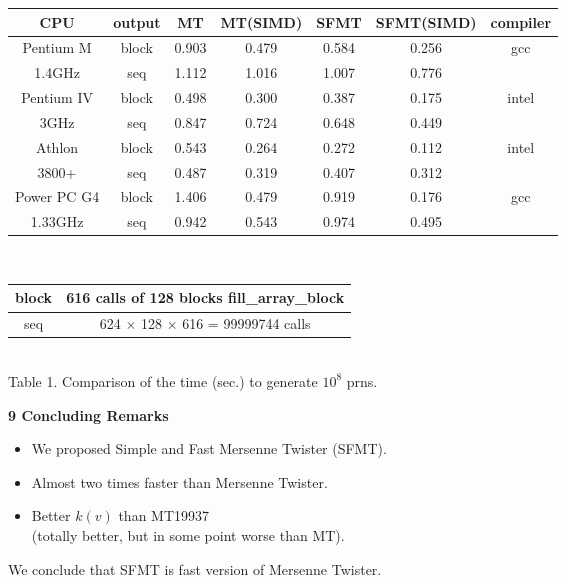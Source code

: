 \documentclass[a4j,12pt,landscape]{jarticle}
\begin{document}
\newpage
\begin{center}
\begin{tabular}{|c|c||c|c|c|c|c|}
\hline
CPU & output & MT & MT{\Large(SIMD)} & SFMT & SFMT{\Large (SIMD)} & {\Large compiler} \\
\hline \hline
{\Large Pentium M}  & block & 0.903 & 0.479 & 0.584 & 0.256 & gcc\\ \cline{2-6}
{\Large 1.4GHz} & seq & 1.112 & 1.016 & 1.007 & 0.776 & \\ \hline
{\Large Pentium IV} & block & 0.498 & 0.300 & 0.387 & 0.175 & intel\\ \cline{2-6}
{\Large 3GHz} & seq & 0.847 & 0.724 & 0.648 & 0.449 & \\ \hline
{\Large Athlon} & block & 0.543 & 0.264 & 0.272 & 0.112 & intel \\ \cline{2-6}
{\Large 3800+} & seq & 0.487 & 0.319 & 0.407 & 0.312 & \\ \hline
{\Large Power PC G4}  & block & 1.406 & 0.479 & 0.919 & 0.176 & gcc\\ \cline{2-6}
{\Large 1.33GHz} & seq & 0.942 & 0.543 & 0.974 & 0.495 &\\ \hline
\end{tabular}
\\
\vskip 5mm
\begin{tabular}{|c|c|} \hline
  block & 616 calls of 128 blocks fill\_array\_block \\ \hline
  seq & 624 $\times$ 128 $\times$ 616 = 99999744 calls\\ \hline
\end{tabular}
\\
\vskip 5mm
Table 1. Comparison of the time (sec.) to generate $10^8$ prns.
\end{center}
\newpage
\noindent
{\bf 9 Concluding Remarks}
\begin{itemize}
\item We proposed Simple and Fast Mersenne Twister (SFMT). 
\item Almost two times faster than Mersenne Twister.
\item Better $k(v)$ than MT19937 \\
(totally better, but in some point worse than MT).
\end{itemize}
We conclude that SFMT is fast version of Mersenne Twister.
\end{document}
